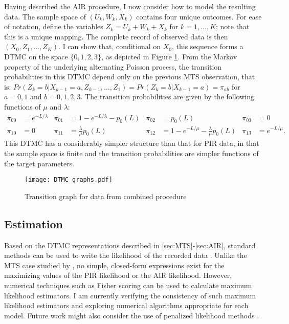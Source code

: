 \documentclass[11pt]{article}
\begin{document}
Having described the AIR procedure, I now consider how to model the resulting data. The sample space of $(U_k,W_k, X_k)$ contains four unique outcomes. For ease of notation, define the variables $Z_k = U_k + W_k + X_k$ for $k=1,...,K$; note that this is a unique mapping. The complete record of observed data is then $(X_0,Z_1,...,Z_K)$. I can show that, conditional on $X_0$, this sequence forms a DTMC on the space $\{0,1,2,3\}$, as depicted in Figure \ref{fig:combined}. From the Markov property of the underlying alternating Poisson process, the transition probabilities in this DTMC depend only on the previous MTS observation, that is: $Pr(Z_k = b | X_{k-1} = a, Z_{k-1},...,Z_1) = Pr(Z_k = b | X_{k-1} = a) = \pi_{ab}$ for $a = 0,1$ and $b = 0,1,2,3$. The transition probabilities are given by the following functions of $\mu$ and $\lambda$: \begin{align*}
\pi_{00} &= e^{-L/\lambda}  & \pi_{01} &= 1 - e^{-L / \lambda} - p_0(L)  & \pi_{02} &= p_0(L) & \pi_{03} &= 0 \\
\pi_{10} &= 0  & \pi_{11} &= \frac{\lambda}{\mu} p_0(L) & \pi_{12} &= 1 - e^{-L / \mu} - \frac{\lambda}{\mu} p_0(L)  & \pi_{13} &=  e^{-L / \mu}.
\end{align*}
This DTMC has a considerably simpler structure than that for PIR data, in that the sample space is finite and the transition probabilities are simpler functions of the target parameters. 

\begin{figure}[tbp]
\centering
\texttt{[image: DTMC\_graphs.pdf]}
\caption{Transition graph for data from combined procedure}
\label{fig:combined}
\end{figure}	

\subsection{Estimation}

Based on the DTMC representations described in \ref{sec:MTS}-\ref{sec:AIR}, standard methods can be used to write the likelihood of the recorded data \citep{Billingsley1961a}. Unlike the MTS case studied by \citet{Brown1977estimation}, no simple, closed-form expressions exist for the maximizing values of the PIR likelihood or the AIR likelihood. However, numerical techniques such as Fisher scoring can be used to calculate maximum likelihood estimators. I am currently verifying the consistency of such maximum likelihood estimators and exploring numerical algorithms appropriate for each model. Future work might also consider the use of penalized likelihood methods \citep[e.g.,][]{Hjort2008}.
\end{document}
